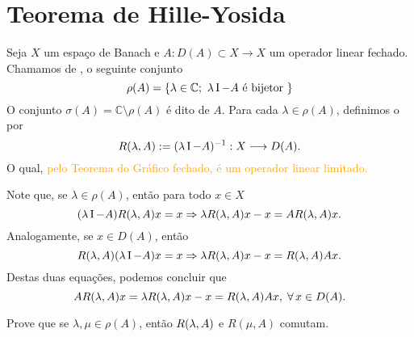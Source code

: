 \section{Teorema de Hille-Yosida}



\begin{definition}
Seja $X$ um espaço de Banach e $A:D(A)\subset X\longrightarrow X$ um operador linear fechado. Chamamos de ,  o seguinte conjunto
\[\rho(A)=\{\lambda \in \mathbb{C};\ \lambda \operatorname{I} -A \text{ é bijetor }\}\]
O conjunto $\sigma(A)=\mathbb{C}\setminus\rho(A)$ é dito   de $A$. Para cada $\lambda\in \rho(A)$, definimos o    por
\[R(\lambda,A):=(\lambda \operatorname{I} -A)^{-1}: X\longrightarrow D(A).\]
O qual, \textcolor{orange}{pelo Teorema do Gráfico fechado, é um operador linear limitado.}


Note que, se $\lambda \in \rho(A)$, então para todo $x\in X$ 
\begin{equation*}
(\lambda \operatorname{I} -A)R(\lambda,A)x=x\Rightarrow \lambda R(\lambda,A) x-x=AR(\lambda,A) x.
\end{equation*}
Analogamente, se $x\in D(A)$, então
\begin{equation*}
R(\lambda,A)(\lambda \operatorname{I} -A)x=x\Rightarrow \lambda R(\lambda,A) x-x=R(\lambda,A) Ax.
\end{equation*}
Destas duas equações, podemos concluir que
\begin{equation}\label{RAAR}
AR(\lambda,A) x=\lambda R(\lambda,A) x-x=R(\lambda,A) Ax,\; \forall\, x\in D(A).
\end{equation}

\begin{xca}
Prove que se $\lambda, \mu\in \rho(A)$, então $R(\lambda,A)$ e $R(\mu,A)$ comutam.
\end{xca}

\end{definition}

